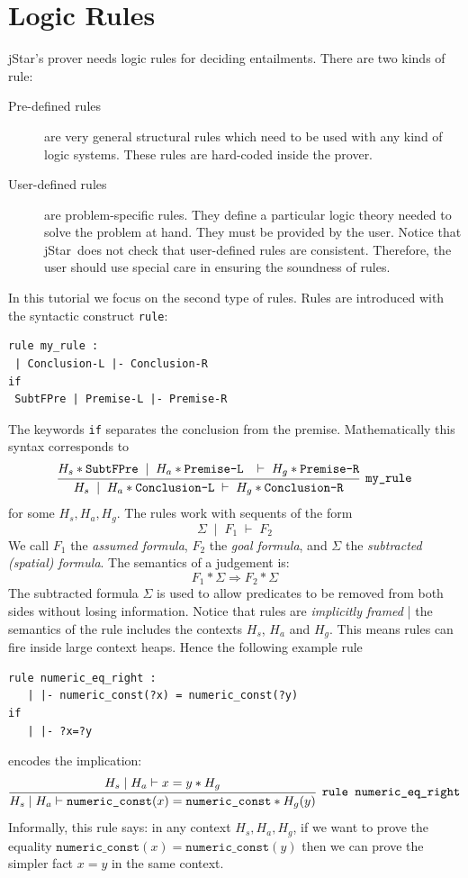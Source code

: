 \documentclass[11pt]{article}
\newcommand{\jStar}{{\sf jStar}}
\begin{document}
\section{Logic Rules}
\label{sec:logic-rules}
\jStar's  prover needs logic rules for deciding entailments. There are
two kinds of rule:
%
\begin{description}
\item[Pre-defined rules] are very general structural rules which need
  to be used with any kind of logic systems. These
  rules are hard-coded inside the prover.
\item[User-defined rules] are problem-specific rules. They define a
  particular logic theory needed to solve the problem at hand. They
  must be provided by the user. Notice that \jStar \ does not check that user-defined rules are 
  consistent. Therefore, the user should use special care in ensuring the soundness of rules.
\end{description} 
In this tutorial we focus on the second type of rules. Rules are introduced with
the syntactic construct {\tt rule}:
\begin{verbatim}
rule my_rule :
 | Conclusion-L |- Conclusion-R 
if 
 SubtFPre | Premise-L |- Premise-R
  \end{verbatim}
The keywords {\tt if} separates the conclusion from the premise.
Mathematically this syntax corresponds to
\[
\infer[\texttt{my\_rule}]
{ H_s \; \mid \; H_a *  \texttt{Conclusion-L}  \; \vdash \; H_g * \texttt{Conclusion-R} }
{ H_s * \texttt{SubtFPre} \; \mid \; H_a * \texttt{Premise-L } \; \vdash \; H_g * \texttt{Premise-R} 
} 
\] for some $H_s, H_a, H_g$. The rules work with sequents of the form
\[
\Sigma \; \mid \; F_1 \; \vdash \; F_2 
\]
We call $F_1$ the \emph{assumed formula}, $F_2$ the \emph{goal formula}, and $\Sigma$ the \emph{subtracted (spatial) formula}.  The semantics of a judgement is:
\[
F_1 *  \Sigma \Longrightarrow F_2 * \Sigma
\]
The subtracted formula $\Sigma$ is used to allow predicates to be
removed from both sides without losing information. 
Notice that rules are \emph{implicitly framed} | the semantics of the rule includes the contexts $H_s$, $H_a$ and $H_g$. This means rules can fire inside large context heaps. 
Hence the 
following example rule 
\begin{verbatim}
rule numeric_eq_right :
   | |- numeric_const(?x) = numeric_const(?y) 
if
   | |- ?x=?y
\end{verbatim}
encodes the implication:
\[
\infer[\texttt{rule numeric\_eq\_right}]{ H_s  \mid H_a \vdash \texttt{numeric\_const}(x) = \texttt{numeric\_const} * H_g(y)}{ H_s  \mid H_a \vdash x=y * H_g}
\]
Informally, this rule says: in any context $H_s, H_a, H_g$, if we want to prove the equality $\texttt{numeric\_const}(x) = \texttt{numeric\_const}(y)$ then we can prove the simpler fact $x=y$ in the same context.
\end{document}
